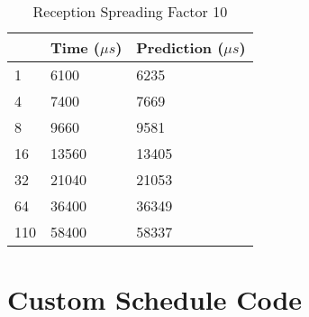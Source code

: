 \begin{table}[H]
\centering
\begin{tabular}{|l|l|l|}
\hline
\rowcolor[HTML]{C0C0C0} 
\multicolumn{1}{|c|}{\cellcolor[HTML]{C0C0C0}Bytes} & Time ($\mu s$) & Prediction ($\mu s$) \\ \hline
1                                                   & 6100      & 6235       \\ \hline
4                                                   & 7400      & 7669       \\ \hline
8                                                   & 9660      & 9581       \\ \hline
16                                                  & 13560     & 13405      \\ \hline
32                                                  & 21040     & 21053      \\ \hline
64                                                  & 36400     & 36349      \\ \hline
110                                                 & 58400     & 58337      \\ \hline
\end{tabular}
\caption{Reception Spreading Factor 10\label{table:rxsf10}}
\end{table}

\section*{Custom Schedule Code\label{code:customsched}}

